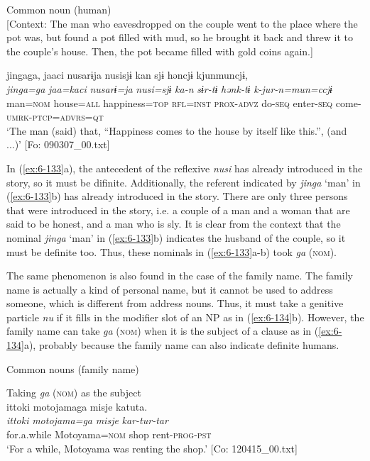 \ex Common noun (human)\\{}
[Context: The man who eavesdropped on the couple went to the place where the pot was, but found a pot filled with mud, so he brought it back and threw it to the couple’s house. Then, the pot became filled with gold coins again.]

{\TM}
\glll jingaga,  jaaci  nusarɨja  nusisjɨ  kan   sjɨ  həncjɨ  kjunmuncjɨ,\\
      \textit{jinga=ga}  \textit{jaa=kaci}  \textit{nusarɨ=ja}  \textit{nusi=sjɨ}  \textit{ka-n}      \textit{sɨr-tɨ}  \textit{hənk-tɨ}  \textit{k-jur-n=mun=ccjɨ}\\
      man=\textsc{nom}  house=\textsc{all}  happiness=\textsc{top}  \textsc{rfl}=\textsc{inst}  \textsc{prox}-\textsc{advz}      do-\textsc{seq}  enter-\textsc{seq}  come-\textsc{umrk}-\textsc{ptcp}=\textsc{advrs}=\textsc{qt}\\
\glt ‘The man (said) that, “Happiness comes to the house by itself like this.”, (and ...)’ [Fo: 090307\_00.txt]
\z
\z

In (\ref{ex:6-133}a), the antecedent of the reflexive \textit{nusi} has already introduced in the story, so it must be difinite. Additionally, the referent indicated by \textit{jinga} ‘man’ in (\ref{ex:6-133}b) has already introduced in the story. There are only three persons that were introduced in the story, i.e. a couple of a man and a woman that are said to be honest, and a man who is sly. It is clear from the context that the nominal \textit{jinga} ‘man’ in (\ref{ex:6-133}b) indicates the husband of the couple, so it must be definite too. Thus, these nominals in (\ref{ex:6-133}a-b) took \textit{ga} (\textsc{nom}).

The same phenomenon is also found in the case of the family name. The family name is actually a kind of personal name, but it cannot be used to address someone, which is different from address nouns. Thus, it must take a genitive particle \textit{nu} if it fills in the modifier slot of an NP as in (\ref{ex:6-134}b). However, the family name can take \textit{ga} (\textsc{nom}) when it is the subject of a clause as in (\ref{ex:6-134}a), probably because the family name can also indicate definite humans.

\ea\label{ex:6-134}
  Common nouns (family name)

 \ea Taking \textit{ga} (\textsc{nom}) as the subject\\
{\TM}
\glll  {\textbar}ittoki{\textbar}  motojamaga  misje  katuta.\\
\textit{ittoki}  \textit{motojama=ga}  \textit{misje}  \textit{kar-tur-tar}\\
for.a.while  Motoyama=\textsc{nom}  shop  rent-\textsc{prog}-\textsc{pst}\\
\glt ‘For a while, Motoyama was renting the shop.’ [Co: 120415\_00.txt]

